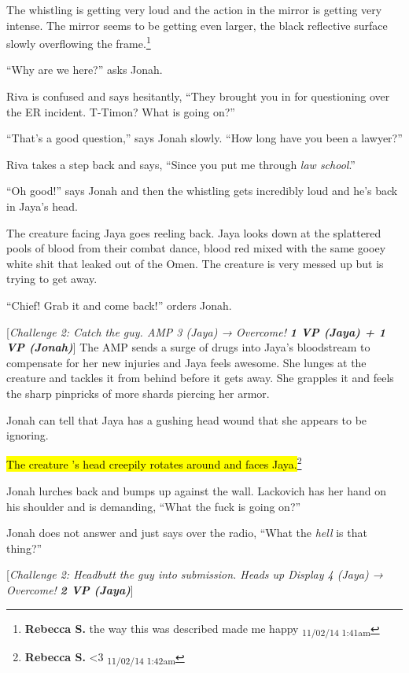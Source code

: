 The whistling is getting very loud and the action in the mirror is getting very intense.  The mirror seems to be getting even larger, the black reflective surface slowly overflowing the frame.\footnote{\textbf{Rebecca S. }the way this was described made me happy \textsubscript{11/02/14 1:41am}}

``Why are we here?'' asks Jonah.

Riva is confused and says hesitantly, ``They brought you in for questioning over the ER incident.  T-Timon?  What is going on?''

``That's a good question,'' says Jonah slowly.  ``How long have you been a lawyer?''

Riva takes a step back and says, ``Since you put me through \textit{law school}.''

``Oh good!'' says Jonah and then the whistling gets incredibly loud and he's back in Jaya's head.



The creature facing Jaya goes reeling back.  Jaya looks down at the splattered pools of blood from their combat dance, blood red mixed with the same gooey white shit that leaked out of the Omen.  The creature is very messed up but is trying to get away.

``Chief!  Grab it and come back!'' orders Jonah.

{[}\textit{Challenge 2: Catch the guy.  AMP 3 (Jaya) → Overcome! }\textit{\textbf{1 VP (Jaya) + 1 VP (Jonah)}}{]}  The AMP sends a surge of drugs into Jaya's bloodstream to compensate for her new injuries and Jaya feels awesome.  She lunges at the creature and tackles it from behind before it gets away.   She grapples it and feels the sharp pinpricks of more shards piercing her armor.  

Jonah can tell that Jaya has a gushing head wound that she appears to be ignoring.

\hl{The creature 's head creepily rotates around and faces Jaya.}\footnote{\textbf{Rebecca S. }\textless 3 \textsubscript{11/02/14 1:42am}}

Jonah lurches back and bumps up against the wall.  Lackovich has her hand on his shoulder and is demanding, ``What the fuck is going on?''

Jonah does not answer and just says over the radio, ``What the \textit{hell} is that thing?''

{[}\textit{Challenge 2: Headbutt the guy into submission.  Heads up Display 4 (Jaya) → Overcome! }\textit{\textbf{2 VP (Jaya)}}{]}


